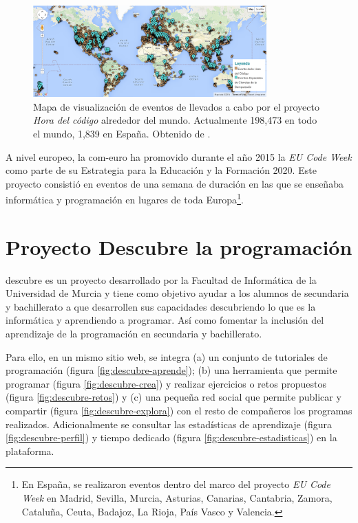 \begin{figure}[!ht]
	\begin{centering}
		\includegraphics[width=0.8\textwidth]{images/map-hour-code.png}
			\caption{Mapa de visualización de eventos de llevados a cabo por el proyecto \emph{Hora del código} alrededor del mundo. Actualmente 198,473 en todo el mundo, 1,839 en España. Obtenido de \cite{hour-of-code}.}
				\label{fig:map-hour-code}
	\end{centering}
\end{figure}


A nivel europeo, la \Gls{com-euro}{\color{red}\cite{ec-code-week}} ha promovido durante el año 2015 la \emph{EU Code Week}{\color{red}\cite{code-week}} como parte de su Estrategia para la Educación y la Formación 2020. Este proyecto consistió en eventos de una semana de duración en las que se enseñaba informática y programación en lugares de toda Europa\footnote{En España, se realizaron eventos dentro del marco del proyecto \emph{EU Code Week} en Madrid, Sevilla, Murcia, Asturias, Canarias, Cantabria, Zamora, Cataluña, Ceuta, Badajoz, La Rioja, País Vasco y Valencia.}.



\section{Proyecto Descubre la programación}
\label{sec:descubre}

\Gls{descubre}\cite{descubre} es un proyecto {\color{red}desarrollado por la Facultad de Informática de la Universidad de Murcia} y tiene como objetivo ayudar a los alumnos de secundaria y bachillerato a que desarrollen sus capacidades descubriendo lo que es la informática y aprendiendo a programar. Así como fomentar la inclusión del aprendizaje de la programación en secundaria y bachillerato. 

Para ello, en un mismo sitio web, se integra (a) un conjunto de tutoriales de programación (figura \ref{fig:descubre-aprende}); (b) una herramienta que permite programar (figura \ref{fig:descubre-crea}) y realizar ejercicios o retos propuestos (figura \ref{fig:descubre-retos}) y (c) una pequeña red social que permite publicar y compartir (figura \ref{fig:descubre-explora}) con el resto de compañeros los programas realizados. Adicionalmente se consultar las estadísticas de aprendizaje (figura \ref{fig:descubre-perfil}) y tiempo dedicado (figura \ref{fig:descubre-estadisticas}) en la plataforma.

